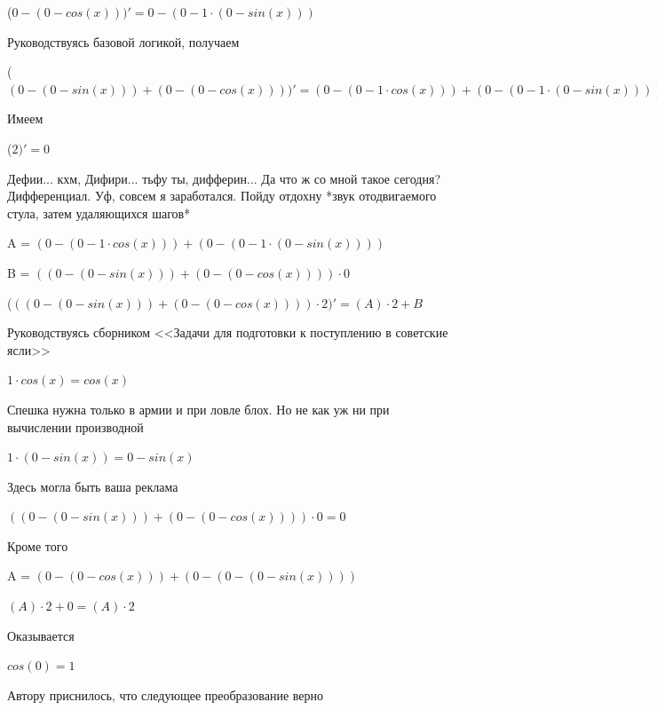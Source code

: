 \documentclass[12pt,a4paper,fleqn]{article}
\begin{document}
\begin{center}
 ($0-(0-cos(x)))'
  = 0-(0-1 \cdot (0-sin(x)))$\end{center}
Руководствуясь базовой логикой, получаем

\begin{center}
 ($(0-(0-sin(x)))+(0-(0-cos(x))))'
  = (0-(0-1 \cdot cos(x)))+(0-(0-1 \cdot (0-sin(x))))$\end{center}
Имеем

\begin{center}
 ($2)'
  = 0$\end{center}
Дефии... кхм, Дифири... тьфу ты, дифферин... Да что ж со мной такое сегодня? Дифференциал. Уф, совсем я заработался. Пойду отдохну *звук отодвигаемого стула, затем удаляющихся шагов*

\begin{center}
A = $(0-(0-1 \cdot cos(x)))+(0-(0-1 \cdot (0-sin(x))))$\end{center}
\begin{center}
B = $((0-(0-sin(x)))+(0-(0-cos(x)))) \cdot 0$\end{center}
\begin{center}
 ($((0-(0-sin(x)))+(0-(0-cos(x)))) \cdot 2)'
  = (A) \cdot 2+B$\end{center}
Руководствуясь сборником <<Задачи для подготовки к поступлению в советские ясли>>\cite{link1}

\begin{center}
$1 \cdot cos(x) = cos(x)$\end{center}
Спешка нужна только в армии и при ловле блох. Но не как уж ни при вычислении производной\cite{link2}

\begin{center}
$1 \cdot (0-sin(x)) = 0-sin(x)$\end{center}
Здесь могла быть ваша реклама

\begin{center}
$((0-(0-sin(x)))+(0-(0-cos(x)))) \cdot 0 = 0$\end{center}
Кроме того

\begin{center}
A = $(0-(0-cos(x)))+(0-(0-(0-sin(x))))$\end{center}
\begin{center}
$(A) \cdot 2+0 = (A) \cdot 2$\end{center}
Оказывается

\begin{center}
\end{center}
\begin{center}$cos(0) = 1$\end{center}
Автору приснилось, что следующее преобразование верно
\end{document}
